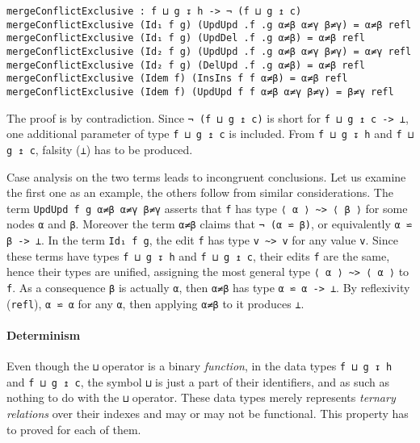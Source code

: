 \documentclass[../Thesis.tex]{subfiles}
\begin{document}
\begin{verbatim}
mergeConflictExclusive : f ⊔ g ↧ h -> ¬ (f ⊔ g ↥ c)
mergeConflictExclusive (Id₁ f g) (UpdUpd .f .g α≠β α≠γ β≠γ) = α≠β refl
mergeConflictExclusive (Id₁ f g) (UpdDel .f .g α≠β) = α≠β refl
mergeConflictExclusive (Id₂ f g) (UpdUpd .f .g α≠β α≠γ β≠γ) = α≠γ refl
mergeConflictExclusive (Id₂ f g) (DelUpd .f .g α≠β) = α≠β refl
mergeConflictExclusive (Idem f) (InsIns f f α≠β) = α≠β refl
mergeConflictExclusive (Idem f) (UpdUpd f f α≠β α≠γ β≠γ) = β≠γ refl
	\end{verbatim}
	
	The proof is by contradiction.
	Since \texttt{¬ (f ⊔ g ↥ c)} is short for \texttt{f ⊔ g ↥ c -> ⊥},
	one additional parameter of type \texttt{f ⊔ g ↥ c} is included.
	From \texttt{f ⊔ g ↧ h} and \texttt{f ⊔ g ↥ c}, falsity (\texttt{⊥})
	has to be produced. 
	
	Case analysis on the two terms leads to incongruent conclusions.
	Let us examine the first one as an example, the others follow from 
	similar considerations.
	The term \texttt{UpdUpd f g α≠β α≠γ β≠γ} asserts that 
	\texttt{f} has type \texttt{⟨ α ⟩ \textasciitilde> ⟨ β ⟩} for some 
	nodes \texttt{α} and \texttt{β}. Moreover the term
	\texttt{α≠β} claims that \texttt{¬ (α ⋍ β)}, or equivalently
	\texttt{α ⋍ β -> ⊥}.
	In the term \texttt{Id₁ f g}, the edit \texttt{f} 
	has type \texttt{v \textasciitilde> v} for any value \texttt{v}. Since these 
	terms have types	\texttt{f ⊔ g ↧ h} and \texttt{f ⊔ g ↥ c}, their edits 
	\texttt{f} are the same, hence their types are unified, assigning the most 
	general type \texttt{⟨ α ⟩ \textasciitilde> ⟨ α ⟩} to \texttt{f}.
	As a consequence \texttt{β} is actually \texttt{α}, then \texttt{α≠β}
	has type \texttt{α ⋍ α -> ⊥}. By reflexivity (\texttt{refl}), \texttt{α ⋍ α} for
	any \texttt{α}, then applying \texttt{α≠β} to it produces \texttt{⊥}.
	
	\paragraph{Determinism}
	\label{par:Determinism}
	Even though the \texttt{⊔} operator is a binary \emph{function}, 
	in the data types \texttt{f ⊔ g ↧ h} and \texttt{f ⊔ g ↥ c}, the symbol
	\texttt{⊔} is just a part of their identifiers, and as such as nothing to
	do with the \texttt{⊔} operator.
	These data types merely represents \emph{ternary relations} over their 
	indexes and may or may not be functional.
	This property has to proved for each of them.
	
\end{document}
